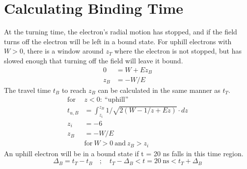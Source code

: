 \documentclass[aps,pra,preprint,groupedaddress]{revtex4-1}
\begin{document}
\section{\label{sec:calcE0} Calculating Binding Time}

At the turning time, the electron's radial motion has stopped, and if the field turns off the electron will be left in a bound state. For uphill electrons with $W > 0$, there is a window around $z_T$ where the electron is not stopped, but has slowed enough that turning off the field will leave it bound.
\begin{align*}
0 & = W + E z_B \\
z_B & = -W/E
\end{align*}
The travel time $t_B$ to reach $z_B$ can be calculated in the same manner as $t_T$.
\begin{align*}
\text{for} ~ & z < 0: ~ \text{``uphill''} \\
t_{u,B} & = \int_{z_i}^{z_B} 1/\sqrt{2(W - 1/z + Ez)} \cdot dz \\
z_i & = -6 \\
z_B & = -W/E \\
 & \text{for} ~ W > 0 ~ \text{and} ~ z_B > z_i
\end{align*}
An uphill electron will be in a bound state if t = 20 ns falls in this time region.
\begin{equation*}
\Delta_B = t_T - t_B \quad ; \quad
t_T - \Delta_B < t = 20 ~ \text{ns} < t_T + \Delta_B
\end{equation*}
\end{document}
